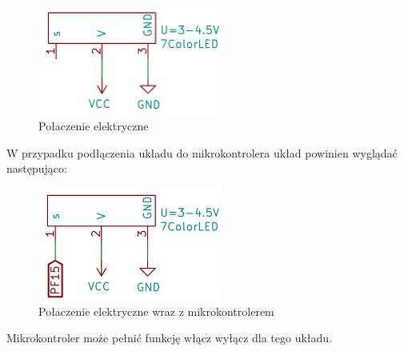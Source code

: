 \documentclass[11pt, a4paper]{article}
\begin{document}


\begin{figure}[h!]
    \centering
    \includegraphics[width=6cm]{fig/7ColorLED/polaczenie_modulu/schematkicad.png}
    \caption{Połaczenie elektryczne}
    \label{fig:my_label}
\end{figure}

W przypadku podłączenia układu do mikrokontrolera układ powinien wyglądać następująco:
\begin{figure}[h!]
    \centering
    \includegraphics[width=6cm]{fig/7ColorLED/polaczenie_modulu/schematkicad2.png}
    \caption{Połaczenie elektryczne wraz z mikrokontrolerem}
    \label{fig:my_label}
\end{figure}
Mikrokontroler może pełnić funkcję włącz wyłącz dla tego układu.
\newpage
\end{document}
